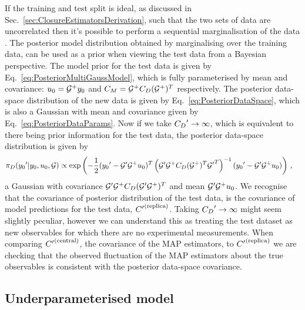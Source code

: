 If the training and test split is ideal, as discussed in
Sec.~\ref{sec:ClosureEstimatorsDerivation}, such that the two sets of data
are uncorrelated then it's
possible to perform a sequential marginalisation of the data \cite{tarantola}.
The posterior model distribution obtained by marginalising over the training
data, can be used as a prior when viewing the test data from a Bayesian
perspective. The model prior for the test data is given by
Eq.~\ref{eq:PosteriorMultiGaussModel}, which is fully
parameterised by mean and covariance: $u_0 = \mathcal{G}^+ y_0$ and
$C_M = \mathcal{G}^+ C_{D} (\mathcal{G}^+)^T$ respectively.
The posterior data-space distribution
of the new data is given by Eq.~\ref{eq:PosteriorDataSpace}, which is also a
Gaussian with mean and covariance given by Eq.~\ref{eq:PosteriorDataParams}.
Now if we take ${{C_{D}}^{\prime}} \to \infty$, which is equivalent to
there being prior information for the test data, the posterior data-space distribution
is given by
\begin{equation}
    \begin{split}
        \pi_D({{y_0}^{\prime}} |y_0, u_0, \mathcal{G})
        &\propto \exp \left( - \frac{1}{2}
            ({{y_0}^{\prime}} - {{\mathcal{G}}^{\prime}} \mathcal{G}^+ u_0)^T
            \left( {{{{\mathcal{G}}^{\prime}}}} \mathcal{G}^+ C_{D} (\mathcal{G}^+)^T {{{\mathcal{G}}^{\prime}}^T} \right)^{-1}
            ({{y_0}^{\prime}} - {{\mathcal{G}}^{\prime}} \mathcal{G}^+ u_0)
        \right) \, ,
    \end{split}
\end{equation}
a Gaussian with covariance
$ {{\mathcal{G}}^{\prime}} \mathcal{G}^+ C_{D} ({{\mathcal{G}}^{\prime}} \mathcal{G}^+)^T$
and mean ${{\mathcal{G}}^{\prime}} \mathcal{G}^+ u_0$. We recognise that the
covariance of posterior
distribution of the test data, is the covariance of model predictions for the
test data, ${{C}^{\prime}}^{(\rm replica)}$. Taking ${{C_{D}}^{\prime}} \to \infty$ might seem
slightly peculiar, however we can understand this as treating the test dataset
as new observables for which there are no experimental measurements. When comparing
${{C}^{\prime}}^{(\rm central)}$, the covariance of the MAP estimators, to ${{C}^{\prime}}^{(\rm replica)}$ we are
checking that the observed fluctuation of the MAP estimators about the true
observables is consistent with the posterior data-space covariance.

\subsection{Underparameterised model}

